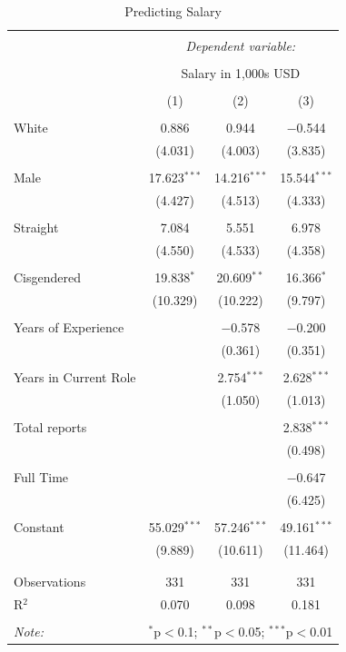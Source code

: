 \documentclass[12pt]{article}         %
\begin{document}
\begin{table}[!htbp] \centering 
  \caption{Predicting Salary} 
  \label{} 
\begin{tabular}{@{\extracolsep{5pt}}lccc} 
\\[-1.8ex]\hline 
\hline \\[-1.8ex] 
 & \multicolumn{3}{c}{\textit{Dependent variable:}} \\ 
\cline{2-4} 
\\[-1.8ex] & \multicolumn{3}{c}{Salary in 1,000s USD} \\ 
\\[-1.8ex] & (1) & (2) & (3)\\ 
\hline \\[-1.8ex] 
 White & 0.886 & 0.944 & $-$0.544 \\ 
  & (4.031) & (4.003) & (3.835) \\ 
  & & & \\ 
 Male & 17.623$^{***}$ & 14.216$^{***}$ & 15.544$^{***}$ \\ 
  & (4.427) & (4.513) & (4.333) \\ 
  & & & \\ 
 Straight & 7.084 & 5.551 & 6.978 \\ 
  & (4.550) & (4.533) & (4.358) \\ 
  & & & \\ 
 Cisgendered & 19.838$^{*}$ & 20.609$^{**}$ & 16.366$^{*}$ \\ 
  & (10.329) & (10.222) & (9.797) \\ 
  & & & \\ 
 Years of Experience &  & $-$0.578 & $-$0.200 \\ 
  &  & (0.361) & (0.351) \\ 
  & & & \\ 
 Years in Current Role &  & 2.754$^{***}$ & 2.628$^{***}$ \\ 
  &  & (1.050) & (1.013) \\ 
  & & & \\ 
 Total reports &  &  & 2.838$^{***}$ \\ 
  &  &  & (0.498) \\ 
  & & & \\ 
 Full Time &  &  & $-$0.647 \\ 
  &  &  & (6.425) \\ 
  & & & \\ 
 Constant & 55.029$^{***}$ & 57.246$^{***}$ & 49.161$^{***}$ \\ 
  & (9.889) & (10.611) & (11.464) \\ 
  & & & \\ 
\hline \\[-1.8ex] 
Observations & 331 & 331 & 331 \\ 
R$^{2}$ & 0.070 & 0.098 & 0.181 \\ 
\hline 
\hline \\[-1.8ex] 
\textit{Note:}  & \multicolumn{3}{r}{$^{*}$p$<$0.1; $^{**}$p$<$0.05; $^{***}$p$<$0.01} \\ 
\end{tabular} 
\end{table} 
\end{document}
